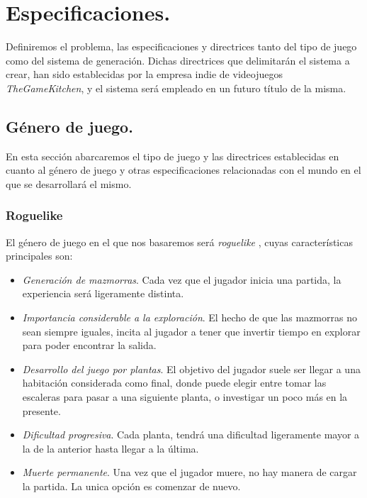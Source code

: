 \chapter{Especificaciones.}\label{cap:capitulo2}

Definiremos el problema, las especificaciones y directrices tanto del tipo de juego como del sistema de generación. Dichas directrices que delimitarán el sistema a crear, han sido establecidas por la empresa indie de videojuegos \emph{TheGameKitchen}, y el sistema será empleado en un futuro título de la misma.

\section{Género de juego.}

En esta sección abarcaremos el tipo de juego y las directrices establecidas en cuanto al género de juego y otras especificaciones relacionadas con el mundo en el que se desarrollará el mismo.

\subsection{Roguelike}

El género de juego en el que nos basaremos será \emph{roguelike} \cite{rlike}, cuyas características principales son:

\begin{itemize}
	\item \emph{Generación de mazmorras}. Cada vez que el jugador inicia una partida, la experiencia será ligeramente distinta.
	\item \emph{Importancia considerable a la exploración}. El hecho de que las mazmorras no sean siempre iguales, incita al jugador a tener que invertir tiempo en explorar para poder encontrar la salida.
	\item \emph{Desarrollo del juego por plantas}. El objetivo del jugador suele ser llegar a una habitación considerada como final, donde puede elegir entre tomar las escaleras para pasar a una siguiente planta, o investigar un poco más en la presente.
	\item \emph{Dificultad progresiva}. Cada planta, tendrá una dificultad ligeramente mayor a la de la anterior hasta llegar a la última.
	\item \emph{Muerte permanente}. Una vez que el jugador muere, no hay manera de cargar la partida. La unica opción es comenzar de nuevo.
\end{itemize}

